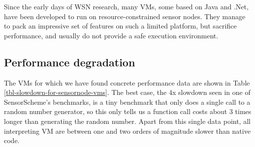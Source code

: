 
Since the early days of WSN research, many VMs, some based on Java and .Net, have been developed to run on resource-constrained sensor nodes. They manage to pack an impressive set of features on such a limited platform, but sacrifice performance, and usually do not provide a safe execution environment.

\subsection{Performance degradation}
\label{sec-introduction-performance}
The VMs for which we have found concrete performance data are shown in Table \ref{tbl-slowdown-for-sensornode-vms}. The best case, the 4x slowdown seen in one of SensorScheme's benchmarks, is a tiny benchmark that only does a single call to a random number generator, so this only tells us a function call costs about 3 times longer than generating the random number. Apart from this single data point, all interpreting VM are between one and two orders of magnitude slower than native code.

